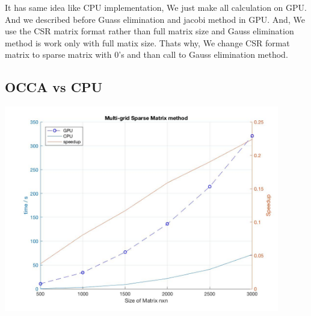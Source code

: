 It has same idea like CPU implementation, We just make all calculation on GPU. And we described before Guass elimination and jacobi method in GPU. And, We use the CSR matrix format rather than full matrix size and Gauss elimination method is work only with full matix size. Thats why, We change CSR format matrix to sparse matrix with 0's and than call to Gauss elimination method.

\subsection{OCCA vs CPU}
\begin{center}
	\includegraphics[width = 12cm]{Chapters/multigrid_sparse_matrix.jpg}
	\label{img:multigridsparse}
\end{center}

%
%








